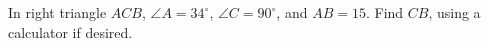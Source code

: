In right triangle $ACB$, $\angle A=34^\circ$, $\angle C=90^\circ$, and $AB=15$. Find $CB$, using a calculator if desired.
